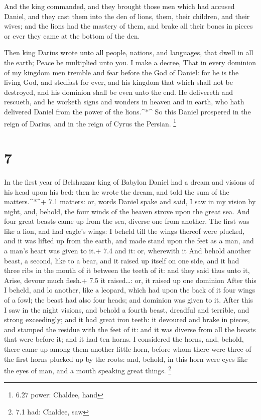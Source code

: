  And the king commanded, and they brought those men which
had accused Daniel, and they cast them into the den of lions, them,
their children, and their wives; and the lions had the mastery of them,
and brake all their bones in pieces or ever they came at the bottom of
the den.

 Then king Darius wrote unto all people, nations, and
languages, that dwell in all the earth; Peace be multiplied unto you.
 I make a decree, That in every dominion of my kingdom men
tremble and fear before the God of Daniel: for he is the living God, and
stedfast for ever, and his kingdom that which shall not be destroyed,
and his dominion shall be even unto the end.  He delivereth
and rescueth, and he worketh signs and wonders in heaven and in earth,
who hath delivered Daniel from the power of the lions.\^{}*\^{}
 So this Daniel prospered in the reign of Darius, and in
the reign of Cyrus the Persian. \footnote{6.27 power: Chaldee, hand}

\hypertarget{section-6}{%
\section{7}\label{section-6}}

 In the first year of Belshazzar king of Babylon Daniel had
a dream and visions of his head upon his bed: then he wrote the dream,
and told the sum of the matters.\^{}*\^{}+ 7.1 matters: or, words
 Daniel spake and said, I saw in my vision by night, and,
behold, the four winds of the heaven strove upon the great sea.
 And four great beasts came up from the sea, diverse one
from another.  The first was like a lion, and had eagle's
wings: I beheld till the wings thereof were plucked, and it was lifted
up from the earth, and made stand upon the feet as a man, and a man's
heart was given to it.+ 7.4 and it: or, wherewith it  And
behold another beast, a second, like to a bear, and it raised up itself
on one side, and it had three ribs in the mouth of it between the teeth
of it: and they said thus unto it, Arise, devour much flesh.+ 7.5 it
raised\ldots: or, it raised up one dominion  After this I
beheld, and lo another, like a leopard, which had upon the back of it
four wings of a fowl; the beast had also four heads; and dominion was
given to it.  After this I saw in the night visions, and
behold a fourth beast, dreadful and terrible, and strong exceedingly;
and it had great iron teeth: it devoured and brake in pieces, and
stamped the residue with the feet of it: and it was diverse from all the
beasts that were before it; and it had ten horns.  I
considered the horns, and, behold, there came up among them another
little horn, before whom there were three of the first horns plucked up
by the roots: and, behold, in this horn were eyes like the eyes of man,
and a mouth speaking great things. \footnote{7.1 had: Chaldee, saw}

